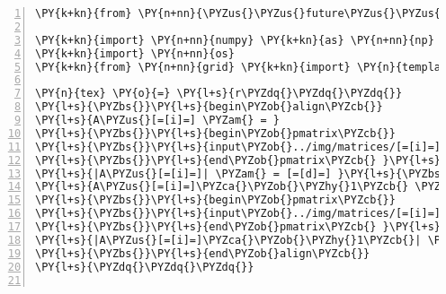\begin{Verbatim}[commandchars=\\\{\},numbers=left,numbersep=0.5em]
\PY{k+kn}{from} \PY{n+nn}{\PYZus{}\PYZus{}future\PYZus{}\PYZus{}} \PY{k+kn}{import} \PY{n}{print\PYZus{}function}

\PY{k+kn}{import} \PY{n+nn}{numpy} \PY{k+kn}{as} \PY{n+nn}{np}
\PY{k+kn}{import} \PY{n+nn}{os}
\PY{k+kn}{from} \PY{n+nn}{grid} \PY{k+kn}{import} \PY{n}{template}

\PY{n}{tex} \PY{o}{=} \PY{l+s}{r\PYZdq{}\PYZdq{}\PYZdq{}}
\PY{l+s}{\PYZbs{}}\PY{l+s}{begin\PYZob{}align\PYZcb{}}
\PY{l+s}{A\PYZus{}[=[i]=] \PYZam{} = }
\PY{l+s}{\PYZbs{}}\PY{l+s}{begin\PYZob{}pmatrix\PYZcb{}}
\PY{l+s}{\PYZbs{}}\PY{l+s}{input\PYZob{}../img/matrices/[=[i]=].tex\PYZcb{}}
\PY{l+s}{\PYZbs{}}\PY{l+s}{end\PYZob{}pmatrix\PYZcb{} }\PY{l+s}{\PYZbs{}}\PY{l+s}{\PYZbs{}}
\PY{l+s}{|A\PYZus{}[=[i]=]| \PYZam{} = [=[d]=] }\PY{l+s}{\PYZbs{}}\PY{l+s}{\PYZbs{}}
\PY{l+s}{A\PYZus{}[=[i]=]\PYZca{}\PYZob{}\PYZhy{}1\PYZcb{} \PYZam{} = }
\PY{l+s}{\PYZbs{}}\PY{l+s}{begin\PYZob{}pmatrix\PYZcb{}}
\PY{l+s}{\PYZbs{}}\PY{l+s}{input\PYZob{}../img/matrices/[=[i]=]i.tex\PYZcb{}}
\PY{l+s}{\PYZbs{}}\PY{l+s}{end\PYZob{}pmatrix\PYZcb{} }\PY{l+s}{\PYZbs{}}\PY{l+s}{\PYZbs{}}
\PY{l+s}{|A\PYZus{}[=[i]=]\PYZca{}\PYZob{}\PYZhy{}1\PYZcb{}| \PYZam{} = [=[di]=]}
\PY{l+s}{\PYZbs{}}\PY{l+s}{end\PYZob{}align\PYZcb{}}
\PY{l+s}{\PYZdq{}\PYZdq{}\PYZdq{}}


\end{Verbatim}

